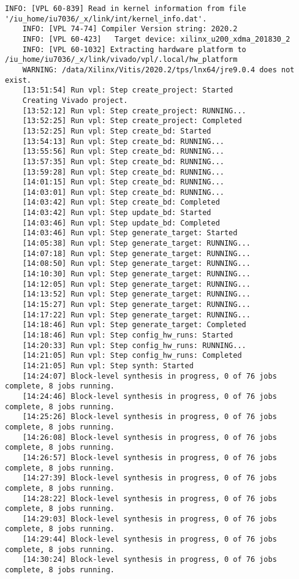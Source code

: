 \begin{lstlisting}[caption=Содержимое файла v++\_vinc.log, label={log1}]
	INFO: [VPL 60-839] Read in kernel information from file '/iu_home/iu7036/_x/link/int/kernel_info.dat'.
	INFO: [VPL 74-74] Compiler Version string: 2020.2
	INFO: [VPL 60-423]   Target device: xilinx_u200_xdma_201830_2
	INFO: [VPL 60-1032] Extracting hardware platform to /iu_home/iu7036/_x/link/vivado/vpl/.local/hw_platform
	WARNING: /data/Xilinx/Vitis/2020.2/tps/lnx64/jre9.0.4 does not exist.
	[13:51:54] Run vpl: Step create_project: Started
	Creating Vivado project.
	[13:52:12] Run vpl: Step create_project: RUNNING...
	[13:52:25] Run vpl: Step create_project: Completed
	[13:52:25] Run vpl: Step create_bd: Started
	[13:54:13] Run vpl: Step create_bd: RUNNING...
	[13:55:56] Run vpl: Step create_bd: RUNNING...
	[13:57:35] Run vpl: Step create_bd: RUNNING...
	[13:59:28] Run vpl: Step create_bd: RUNNING...
	[14:01:15] Run vpl: Step create_bd: RUNNING...
	[14:03:01] Run vpl: Step create_bd: RUNNING...
	[14:03:42] Run vpl: Step create_bd: Completed
	[14:03:42] Run vpl: Step update_bd: Started
	[14:03:46] Run vpl: Step update_bd: Completed
	[14:03:46] Run vpl: Step generate_target: Started
	[14:05:38] Run vpl: Step generate_target: RUNNING...
	[14:07:18] Run vpl: Step generate_target: RUNNING...
	[14:08:50] Run vpl: Step generate_target: RUNNING...
	[14:10:30] Run vpl: Step generate_target: RUNNING...
	[14:12:05] Run vpl: Step generate_target: RUNNING...
	[14:13:52] Run vpl: Step generate_target: RUNNING...
	[14:15:27] Run vpl: Step generate_target: RUNNING...
	[14:17:22] Run vpl: Step generate_target: RUNNING...
	[14:18:46] Run vpl: Step generate_target: Completed
	[14:18:46] Run vpl: Step config_hw_runs: Started
	[14:20:33] Run vpl: Step config_hw_runs: RUNNING...
	[14:21:05] Run vpl: Step config_hw_runs: Completed
	[14:21:05] Run vpl: Step synth: Started
	[14:24:07] Block-level synthesis in progress, 0 of 76 jobs complete, 8 jobs running.
	[14:24:46] Block-level synthesis in progress, 0 of 76 jobs complete, 8 jobs running.
	[14:25:26] Block-level synthesis in progress, 0 of 76 jobs complete, 8 jobs running.
	[14:26:08] Block-level synthesis in progress, 0 of 76 jobs complete, 8 jobs running.
	[14:26:57] Block-level synthesis in progress, 0 of 76 jobs complete, 8 jobs running.
	[14:27:39] Block-level synthesis in progress, 0 of 76 jobs complete, 8 jobs running.
	[14:28:22] Block-level synthesis in progress, 0 of 76 jobs complete, 8 jobs running.
	[14:29:03] Block-level synthesis in progress, 0 of 76 jobs complete, 8 jobs running.
	[14:29:44] Block-level synthesis in progress, 0 of 76 jobs complete, 8 jobs running.
	[14:30:24] Block-level synthesis in progress, 0 of 76 jobs complete, 8 jobs running.

\end{lstlisting}
